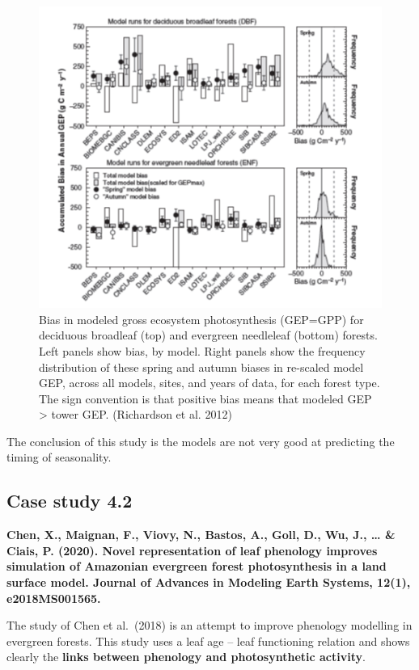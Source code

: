 \documentclass[
  12pt,
  oneside]{book}
\begin{document}
\begin{figure}

{\centering \includegraphics[width=0.8\linewidth]{figures/chap4/f48_bias_richardson} 

}

\caption{Bias in modeled gross ecosystem photosynthesis (GEP=GPP) for deciduous broadleaf (top) and evergreen needleleaf (bottom) forests. Left panels show bias, by model. Right panels show the frequency distribution of these spring and autumn biases in re-scaled model GEP, across all models, sites, and years of data, for each forest type. The sign convention is that positive bias means that modeled GEP > tower GEP. (Richardson et al. 2012)}\label{fig:f410}
\end{figure}

The conclusion of this study is the models are not very good at predicting the timing of seasonality.

\hypertarget{case-study-4.2}{%
\subsection{Case study 4.2}\label{case-study-4.2}}

\textbf{Chen, X., Maignan, F., Viovy, N., Bastos, A., Goll, D., Wu, J., \ldots{} \& Ciais, P. (2020). Novel representation of leaf phenology improves simulation of Amazonian evergreen forest photosynthesis in a land surface model. Journal of Advances in Modeling Earth Systems, 12(1), e2018MS001565.}

The study of Chen et al.~(2018) is an attempt to improve phenology modelling in evergreen forests. This study uses a leaf age -- leaf functioning relation and shows clearly the \textbf{links between phenology and photosynthetic activity}.
\end{document}
